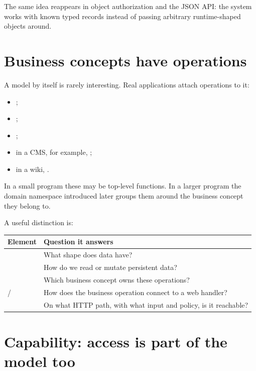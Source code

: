 The same idea reappears in object authorization and the JSON API: the system works with known typed records instead of passing arbitrary runtime-shaped objects around.

\section{Business concepts have operations}

A model by itself is rarely interesting. Real applications attach operations to it:

\begin{itemize}
  \item {};
  \item {};
  \item {};
  \item in a CMS, for example, ;
  \item in a wiki, .
\end{itemize}

In a small program these may be top-level functions. In a larger program the  domain namespace introduced later groups them around the business concept they belong to.

A useful distinction is:

\begin{center}
\begin{tabularx}{\textwidth}{@{}lY@{}}
\toprule
Element & Question it answers \\
\midrule
{} & What shape does  data have? \\
 & How do we read or mutate persistent data? \\
 & Which business concept owns these operations? \\
/ & How does the business operation connect to a web handler? \\
 & On what HTTP path, with what input and policy, is it reachable? \\
\bottomrule
\end{tabularx}
\end{center}

\section{Capability: access is part of the model too}

